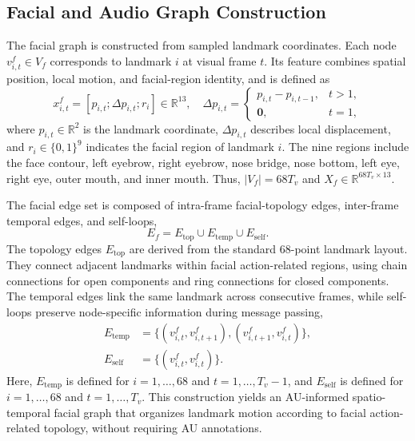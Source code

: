 \documentclass[conference]{IEEEtran}
\begin{document}
\subsection{Facial and Audio Graph Construction}

The facial graph is constructed from sampled landmark coordinates. Each node $v^f_{i,t}\in V_f$ corresponds to landmark $i$ at visual frame $t$. Its feature combines spatial position, local motion, and facial-region identity, and is defined as
\begin{equation}
x^f_{i,t}=[p_{i,t};\Delta p_{i,t};r_i]\in\mathbb{R}^{13},
\quad
\Delta p_{i,t}=
\begin{cases}
p_{i,t}-p_{i,t-1}, & t>1,\\
\mathbf{0}, & t=1,
\end{cases}
\label{eqfacenode}
\end{equation}
where $p_{i,t}\in\mathbb{R}^{2}$ is the landmark coordinate, $\Delta p_{i,t}$ describes local displacement, and $r_i\in\{0,1\}^{9}$ indicates the facial region of landmark $i$. The nine regions include the face contour, left eyebrow, right eyebrow, nose bridge, nose bottom, left eye, right eye, outer mouth, and inner mouth. Thus, $|V_f|=68T_v$ and $X_f\in\mathbb{R}^{68T_v\times 13}$.


The facial edge set is composed of intra-frame facial-topology edges, inter-frame temporal edges, and self-loops,
\begin{equation}
E_f=E_{\mathrm{top}}\cup E_{\mathrm{temp}}\cup E_{\mathrm{self}}.
\label{eqfaceedges}
\end{equation}
The topology edges $E_{\mathrm{top}}$ are derived from the standard 68-point landmark layout. They connect adjacent landmarks within facial action-related regions, using chain connections for open components and ring connections for closed components. The temporal edges link the same landmark across consecutive frames, while self-loops preserve node-specific information during message passing,
\begin{equation}
\begin{aligned}
E_{\mathrm{temp}}
&=\{(v^f_{i,t},v^f_{i,t+1}),
(v^f_{i,t+1},v^f_{i,t})\},\\
E_{\mathrm{self}}
&=\{(v^f_{i,t},v^f_{i,t})\}.
\end{aligned}
\label{eqtempself}
\end{equation}
Here, $E_{\mathrm{temp}}$ is defined for $i=1,\ldots,68$ and $t=1,\ldots,T_v-1$, and $E_{\mathrm{self}}$ is defined for $i=1,\ldots,68$ and $t=1,\ldots,T_v$. This construction yields an AU-informed spatio-temporal facial graph that organizes landmark motion according to facial action-related topology, without requiring AU annotations.
\end{document}
